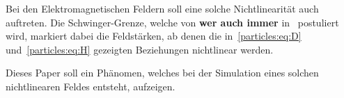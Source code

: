 \begin{refsection}
Bei den Elektromagnetischen Feldern soll eine solche Nichtlinearität auch auftreten.
Die Schwinger-Grenze, welche von \textbf{wer auch immer} in~\cite{todo} postuliert wird, markiert dabei die Feldstärken, ab denen die in~\ref{particles:eq:D} und~\ref{particles:eq:H} gezeigten Beziehungen nichtlinear werden. %

Dieses Paper soll ein Phänomen, welches bei der Simulation eines solchen nichtlinearen Feldes entsteht, aufzeigen.



\printbibliography[heading=subbibliography]
\end{refsection}
